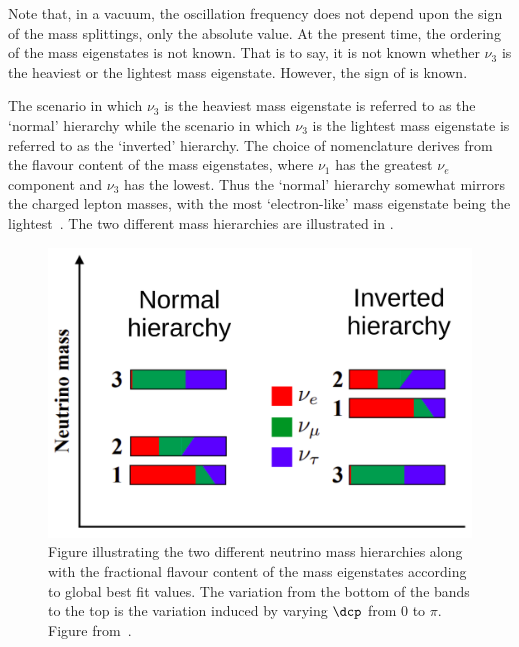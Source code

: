 Note that, in a vacuum, the oscillation frequency does not depend upon the sign of the mass splittings, only the absolute value.
At the present time, the ordering of the mass eigenstates is not known.
That is to say, it is not known whether $\nu_{3}$ is the heaviest or the lightest mass eigenstate.
However, the sign of  is known.

The scenario in which $\nu_{3}$ is the heaviest mass eigenstate is referred to as the `normal' hierarchy while the scenario in which $\nu_{3}$ is the lightest mass eigenstate is referred to as the `inverted' hierarchy.
The choice of nomenclature derives from the flavour content of the mass eigenstates, where $\nu_{1}$ has the greatest $\nu_{e}$ component and $\nu_{3}$ has the lowest.
Thus the `normal' hierarchy somewhat mirrors the charged lepton masses, with the most `electron-like' mass eigenstate being the lightest~\cite{massHierarchy}.
The two different mass hierarchies are illustrated in .

\begin{figure}[h]
  \centering
  \includegraphics[width=.7\linewidth]{files/figures/theory/mh}
  \caption[Diagram of neutrino mass hierarchies.]{Figure illustrating the two different neutrino mass hierarchies along with the fractional flavour content of the mass eigenstates according to global best fit values. The variation from the bottom of the bands to the top is the variation induced by varying $\dcp$ from 0 to $\pi$. Figure from~\cite{tdrVol2}.}
  \label{fig:massHierarchy}
\end{figure}

